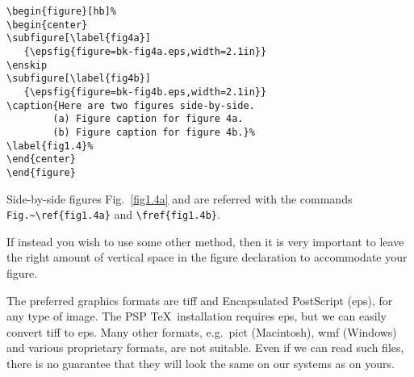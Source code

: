 \begin{verbatim}
\begin{figure}[hb]%
\begin{center}
\subfigure[\label{fig4a}]
   {\epsfig{figure=bk-fig4a.eps,width=2.1in}}
\enskip
\subfigure[\label{fig4b}]
   {\epsfig{figure=bk-fig4b.eps,width=2.1in}}
\caption{Here are two figures side-by-side.
        (a) Figure caption for figure 4a.
        (b) Figure caption for figure 4b.}%
\label{fig1.4}%
\end{center}
\end{figure}
\end{verbatim}

Side-by-side figures Fig.~\ref{fig1.4a} and  are
referred with the commands \verb|Fig.~\ref{fig1.4a}| and
\verb|\fref{fig1.4b}|.

If instead you wish to use some other method, then it is very
important to leave the right amount of vertical space in the figure
declaration to accommodate your figure.

The preferred graphics formats are tiff and Encapsulated PostScript
(eps), for any type of image. The PSP \TeX\ installation requires
eps, but we can easily convert tiff to eps. Many other formats,
e.g.~pict (Macintosh), wmf (Windows) and various proprietary
formats, are not suitable. Even if we can read such files, there is
no guarantee that they will look the same on our systems as on
yours.

\begin{sidewaysfigure}
\begin{center}
\end{center}
\caption{Sample figure caption.}
\label{fig1.5}
\end{sidewaysfigure}


